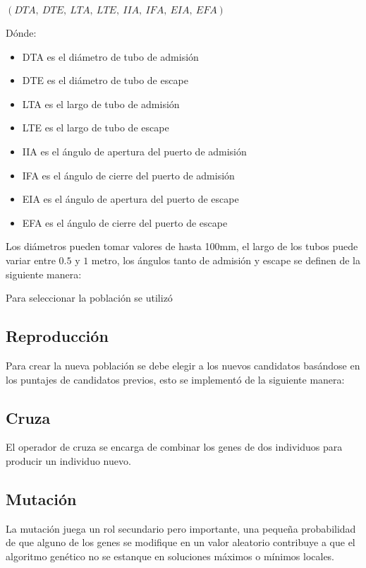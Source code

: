 \centerline{$(DTA,\ DTE,\ LTA,\ LTE,\ IIA,\ IFA,\ EIA,\ EFA)$}
%
Dónde:
%
\begin{itemize}
    \item DTA es el diámetro de tubo de admisión
    \item DTE es el diámetro de tubo de escape
    \item LTA es el largo de tubo de admisión
    \item LTE es el largo de tubo de escape
    \item IIA es el ángulo de apertura del puerto de admisión
    \item IFA es el ángulo de cierre del puerto de admisión
    \item EIA es el ángulo de apertura del puerto de escape
    \item EFA es el ángulo de cierre del puerto de escape
\end{itemize}

Los diámetros pueden tomar valores de hasta 100mm, el largo de los
tubos puede variar entre $0.5$ y $1$ metro, los ángulos tanto de
admisión y escape se definen de la siguiente manera:



Para seleccionar la población se utilizó 


\subsection{Reproducción}

Para crear la nueva población se debe elegir a los nuevos candidatos basándose
en los puntajes de candidatos previos, esto se implementó de la siguiente
manera:

\subsection{Cruza}
%
El operador de cruza se encarga de combinar los genes de dos individuos para
producir un individuo nuevo.

\subsection{Mutación}
%
La mutación juega un rol secundario pero importante, una pequeña probabilidad
de que alguno de los genes se modifique en un valor aleatorio contribuye a que
el algoritmo genético no se estanque en soluciones máximos o mínimos locales.

